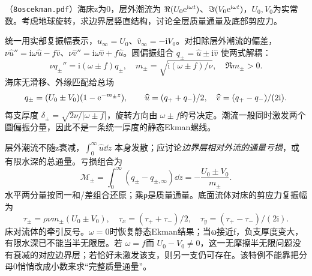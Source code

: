 \begin{exercise}\label{task:fluid-oscekman}
（\texttt{8oscekman.pdf}）海床z为0，层外潮流为 $\Re(U_0\mathrm e^{\mathrm i\omega t})$、$\Im(V_0\mathrm e^{\mathrm i\omega t})$，$U_0,V_0$为实常数。考虑地球旋转，求边界层竖直结构，讨论全层质量通量及底部剪应力。
\end{exercise}
\begin{solution}
统一用实部复振幅表示，$\widehat u_\infty=U_0$、$\widehat v_\infty=-\mathrm iV_0$。对扣除层外潮流的偏差，$\nu\widehat u''=\mathrm i\omega\widehat u-f\widehat v$、$\nu\widehat v''=\mathrm i\omega\widehat v+f\widehat u$。圆偏振组合 $q_\pm=\widehat u\pm\mathrm i\widehat v$ 使两式解耦：
\[
 \nu q_\pm''=\mathrm i(\omega\pm f)q_\pm,
 \quad m_\pm=\sqrt{\mathrm i(\omega\pm f)/\nu},\quad\Re m_\pm>0.
\]
海床无滑移、外缘匹配给总场
\[
 q_\pm=(U_0\pm V_0)(1-\mathrm e^{-m_\pm z}),\qquad
 \widehat u=(q_++q_-)/2,\quad\widehat v=(q_+-q_-)/(2\mathrm i).
\]
每支厚度 $\delta_\pm=\sqrt{2\nu/|\omega\pm f|}$，旋转方向由 $\omega\pm f$的号决定。潮流一般同时激发两个圆偏振分量，因此不是一条统一厚度的静态Ekman螺线。

层外潮流不随z衰减，$\int_0^\infty\widehat u\dd z$ 本身发散；应讨论\emph{边界层相对外流的通量亏损}，或有限水深的总通量。亏损组合为
\[
 \mathcal M_\pm=\int_0^\infty(q_\pm-q_{\pm,\infty})\dd z
             =-\frac{U_0\pm V_0}{m_\pm}.
\]
水平两分量按同一和/差组合还原；乘ρ是质量通量。底面流体对床的剪应力复振幅为
\[
 \tau_\pm=\rho\nu m_\pm(U_0\pm V_0),\quad
 \tau_x=(\tau_++\tau_-)/2,\quad
 \tau_y=(\tau_+-\tau_-)/(2\mathrm i).
\]
床对流体的牵引反号。$\omega=0$时恢复静态Ekman结果；当ω接近f，负支厚度变大，有限水深已不能当半无限层。若 $\omega=f$而 $U_0-V_0\ne0$，这一无摩擦半无限问题没有衰减的对应边界层；若恰好未激发该支，则另一支仍可存在。该特例不能靠把分母0悄悄改成小数来求“完整质量通量”。
\end{solution}

